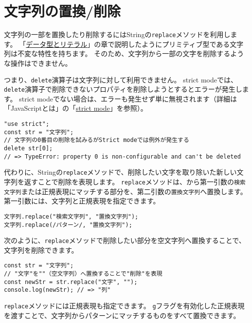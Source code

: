 \hypertarget{replace-delete}{%
\section{文字列の置換/削除}\label{replace-delete}}

文字列の一部を置換したり削除するにはStringの\texttt{replace}メソッドを利用します。
「\hyperlink{data-type-and-literal}{データ型とリテラル}」の章で説明したようにプリミティブ型である文字列は不変な特性を持ちます。
そのため、文字列から一部の文字を削除するような操作はできません。

つまり、\texttt{delete}演算子は文字列に対して利用できません。
strict modeでは、\texttt{delete}演算子で削除できないプロパティを削除しようとするとエラーが発生します。
strict modeでない場合は、エラーも発生せず単に無視されます（詳細は「JavaScriptとは」の「\hyperlink{strict-mode}{strict mode}」を参照）。

\begin{lstlisting}
"use strict";
const str = "文字列";
// 文字列の0番目の削除を試みるがStrict modeでは例外が発生する
delete str[0]; 
// => TypeError: property 0 is non-configurable and can't be deleted
\end{lstlisting}

代わりに、Stringの\texttt{replace}メソッドで、削除したい文字を取り除いた新しい文字列を返すことで削除を表現します。
\texttt{replace}メソッドは、\textbf{}から第一引数の\texttt{検索文字列}または正規表現にマッチする部分を、第二引数の\texttt{置換文字列}へ置換します。
第一引数には、文字列と正規表現を指定できます。
\newpage
\begin{lstlisting}
文字列.replace("検索文字列", "置換文字列");
文字列.replace(/パターン/, "置換文字列");
\end{lstlisting}

次のように、\texttt{replace}メソッドで削除したい部分を空文字列へ置換することで、文字列を削除できます。

\begin{lstlisting}
const str = "文字列";
// "文字"を""（空文字列）へ置換することで"削除"を表現
const newStr = str.replace("文字", "");
console.log(newStr); // => "列"
\end{lstlisting}

\texttt{replace}メソッドには正規表現も指定できます。
\texttt{g}フラグを有効化した正規表現を渡すことで、文字列からパターンにマッチするものをすべて置換できます。

